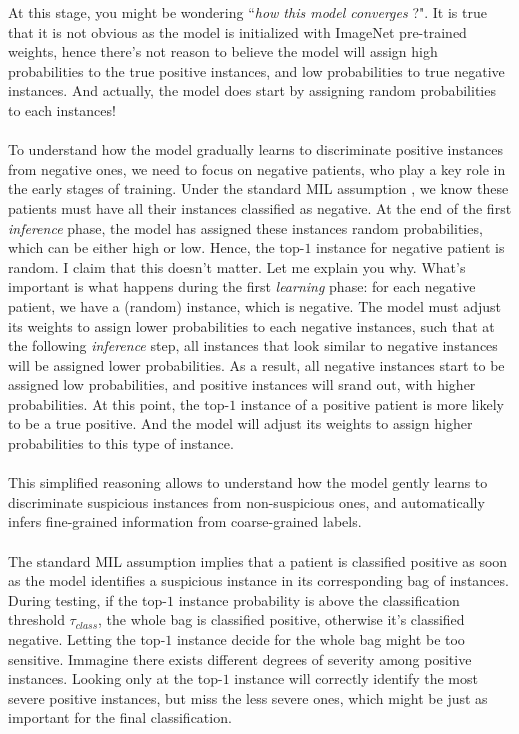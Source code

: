 \documentclass[final]{cvpr}
\begin{document}
	\noindent
	 At this stage, you might be wondering ``\textit{how this model converges} ?". It is true that it is not obvious as the model is initialized with ImageNet pre-trained weights, hence there's not reason to believe the model will assign high probabilities to the true positive instances, and low probabilities to true negative instances. And actually, the model does start by assigning random probabilities to each instances!  \\
	 \\
	 To understand how the model gradually learns to discriminate positive instances from negative ones, we need to focus on negative patients, who play a key role in the early stages of training. Under the standard MIL assumption , we know these patients must have all their instances classified as negative. At the end of the first \textit{inference} phase, the model has assigned these instances random probabilities, which can be either high or low. Hence, the top-$1$ instance for negative patient is random. I claim that this doesn't matter. Let me explain you why. What's important is what happens during the first \textit{learning} phase: for each negative patient, we have a (random) instance, which is negative. The model must adjust its weights to assign lower probabilities to each negative instances, such that at the following \textit{inference} step, all instances that look similar to negative instances will be assigned lower probabilities. As a result, all negative instances start to be assigned low probabilities, and positive instances will srand out, with higher probabilities. At this point, the top-$1$ instance of a positive patient is more likely to be a true positive. And the model will adjust its weights to assign higher probabilities to this type of instance.\\
	 \\
	 This simplified reasoning allows to understand	how the model gently learns to discriminate suspicious instances from non-suspicious ones, and automatically infers fine-grained information from coarse-grained labels.\\
	 \\
	The standard MIL assumption implies that a patient is classified positive as soon as the model identifies a suspicious instance in its corresponding bag of instances. During testing, if the top-$1$ instance probability is above the classification threshold $\tau_{class}$, the whole bag is classified positive, otherwise it's classified negative. Letting the top-$1$ instance decide for the whole bag might be too sensitive. Immagine there exists different degrees of severity among positive instances. Looking only at the top-$1$ instance will correctly identify the most severe positive instances, but miss the less severe ones, which might be just as important for the final classification. 
	
\end{document}
